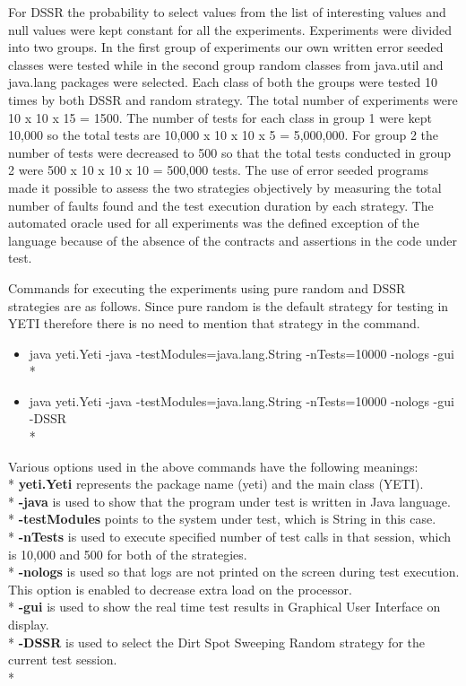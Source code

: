 \documentclass[10pt, conference, compsocconf]{IEEEtran}
\begin{document}
For DSSR the probability to select values from the list of interesting values and null values were kept constant for all the experiments. Experiments were divided into two groups. In the first group of experiments our own written error seeded classes were tested while in the second group random classes from java.util and java.lang packages were selected. Each class of both the groups were tested 10 times by both DSSR and random strategy. The total number of experiments were 10 x 10 x 15 = 1500. The number of tests for each class in group 1 were kept 10,000 so the total tests are 10,000 x 10 x 10 x 5 = 5,000,000.  For group 2 the number of tests were decreased to 500 so that the total tests conducted in group 2 were 500 x 10 x 10 x 10 = 500,000 tests. The use of error seeded programs made it possible to assess the two strategies objectively by measuring the total number of faults found and the test execution duration by each strategy. The automated oracle used for all experiments was the defined exception of the language because of the absence of the contracts and assertions in the code under test.

Commands for executing the experiments using pure random and DSSR strategies are as follows. Since pure random is the default strategy for testing in YETI therefore there is no need to mention that strategy in the command.

\begin{itemize}

\item java yeti.Yeti -java -testModules=java.lang.String -nTests=10000 -nologs -gui\\*

\item java yeti.Yeti -java -testModules=java.lang.String -nTests=10000 -nologs -gui -DSSR\\*

\end{itemize}

Various options used in the above commands have the following meanings:\\*
\textbf{yeti.Yeti} represents the package name (yeti) and the main class (YETI).\\*
\textbf{-java} is used to show that the program under test is written in Java language.\\*
\textbf{-testModules} points to the system under test, which is String in this case.\\*
\textbf{-nTests} is used to execute specified number of test calls in that session, which is 10,000 and 500 for both of the strategies.\\*
\textbf{-nologs} is used so that logs are not printed on the screen during test execution. This option is enabled to decrease extra load on the processor.\\*
\textbf{-gui} is used to show the real time test results in Graphical User Interface on display.\\*
\textbf{-DSSR} is used to select the Dirt Spot Sweeping Random strategy for the current test session.\\*
\end{document}

